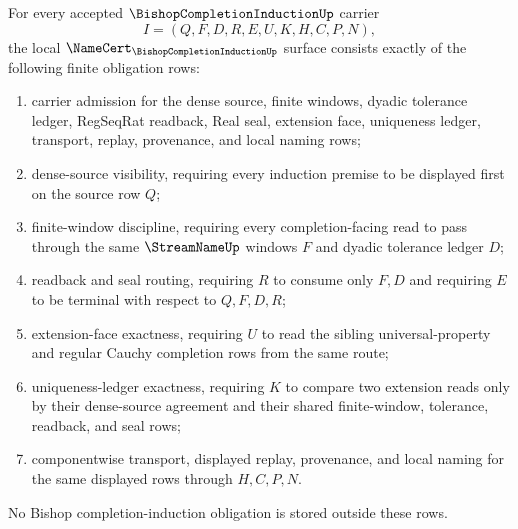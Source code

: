 \begin{theorem}
\label{thm:bishop-completion-induction-namecert-obligations}
For every accepted $\BishopCompletionInductionUp$ carrier
$$
I=(Q,F,D,R,E,U,K,H,C,P,N),
$$
the local $\NameCert_{\BishopCompletionInductionUp}$ surface consists exactly of the following finite obligation rows:
\begin{enumerate}
\item carrier admission for the dense source, finite windows, dyadic tolerance ledger, RegSeqRat readback, Real seal, extension face, uniqueness ledger, transport, replay, provenance, and local naming rows;
\item dense-source visibility, requiring every induction premise to be displayed first on the source row $Q$;
\item finite-window discipline, requiring every completion-facing read to pass through the same $\StreamNameUp$ windows $F$ and dyadic tolerance ledger $D$;
\item readback and seal routing, requiring $R$ to consume only $F,D$ and requiring $E$ to be terminal with respect to $Q,F,D,R$;
\item extension-face exactness, requiring $U$ to read the sibling universal-property and regular Cauchy completion rows from the same route;
\item uniqueness-ledger exactness, requiring $K$ to compare two extension reads only by their dense-source agreement and their shared finite-window, tolerance, readback, and seal rows;
\item componentwise transport, displayed replay, provenance, and local naming for the same displayed rows through $H,C,P,N$.
\end{enumerate}
No Bishop completion-induction obligation is stored outside these rows.
\end{theorem}
